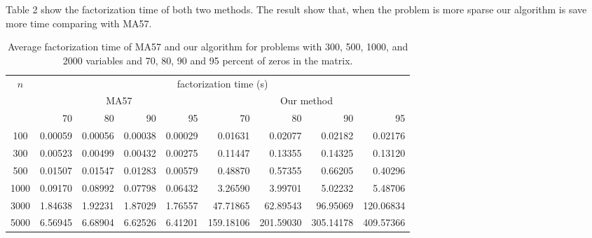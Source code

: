 \documentclass{article}
\begin{document}
\ifx 
Table 2 show the factorization time of both two methods.
The result show that, when the problem is more sparse our algorithm is save more time comparing with MA57. 
\begin{table}
\caption{Average factorization time of MA57 and our algorithm for problems with 300, 500, 1000, and 2000 variables and 70, 80, 90 and 95 percent of zeros in the matrix.}
\begin{tabular}{|c|r|r|r|r|r|r|r|r|}
\hline
\multirow{3}{*}{$n$} 
&\multicolumn{8}{c|}{factorization time (s)}\\
\cline{2-9}
&\multicolumn{4}{c|}{MA57}
&\multicolumn{4}{c|}{Our method}\\
\cline{2-9}
&70
&80
&90
&95
&70
&80
&90
&95\\
\hline
100	&	0.00059	&	0.00056	&	0.00038	&	0.00029	&	0.01631	&	0.02077	&	0.02182	&	0.02176	\\													
300	&	0.00523	&	0.00499	&	0.00432	&	0.00275	&	0.11447	&	0.13355	&	0.14325	&	0.13120	\\													
500	&	0.01507	&	0.01547	&	0.01283	&	0.00579	&	0.48870	&	0.57355	&	0.66205	&	0.40296	\\													
1000	&	0.09170	&	0.08992	&	0.07798	&	0.06432	&	3.26590	&	3.99701	&	5.02232	&	5.48706	\\													
3000	&	1.84638	&	1.92231	&	1.87029	&	1.76557	&	47.71865	&	62.89543	&	96.95069	&	120.06834	\\													
5000	&	6.56945	&	6.68904	&	6.62526	&	6.41201	&	159.18106	&	201.59030	&	305.14178	&	409.57366	\\													\hline
\end{tabular}
\end{table}
\fi
\end{document}
